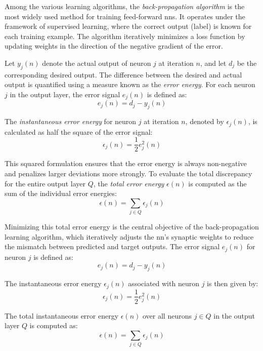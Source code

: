 Among the various learning algorithms, the \textit{back-propagation algorithm} is the most widely used method for training feed-forward \ac{nn}s. It operates under the framework of supervised learning, where the correct output (label) is known for each training example. The algorithm iteratively minimizes a loss function by updating weights in the direction of the negative gradient of the error.

Let $y_j(n)$ denote the actual output of neuron $j$ at iteration $n$, and let $d_j$ be the corresponding desired output. The difference between the desired and actual output is quantified using a measure known as the \textit{error energy}. For each neuron \( j \) in the output layer, the error signal \( e_j(n) \) is defined as:
\begin{equation}
	e_j(n) = d_j - y_j(n)
\end{equation}

The \textit{instantaneous error energy} for neuron \( j \) at iteration \( n \), denoted by \( \epsilon_j(n) \), is calculated as half the square of the error signal:
\begin{equation}
	\epsilon_j(n) = \frac{1}{2} e_j^2(n)
\end{equation}

This squared formulation ensures that the error energy is always non-negative and penalizes larger deviations more strongly. To evaluate the total discrepancy for the entire output layer \( Q \), the \textit{total error energy} \( \epsilon(n) \) is computed as the sum of the individual error energies:
\begin{equation}
	\epsilon(n) = \sum_{j \in Q} \epsilon_j(n)
\end{equation}

Minimizing this total error energy is the central objective of the back-propagation learning algorithm, which iteratively adjusts the \ac{nn}'s synaptic weights to reduce the mismatch between predicted and target outputs. The error signal $e_j(n)$ for neuron $j$ is defined as:
\begin{equation}
	e_j(n) = d_j - y_j(n)
\end{equation}

The instantaneous error energy $\epsilon_j(n)$ associated with neuron $j$ is then given by:
\begin{equation}
	\epsilon_j(n) = \frac{1}{2} e_j^2(n)
\end{equation}

The total instantaneous error energy $\epsilon(n)$ over all neurons $j \in Q$ in the output layer $Q$ is computed as:
\begin{equation}
	\epsilon(n) = \sum_{j \in Q} \epsilon_j(n)
\end{equation}

